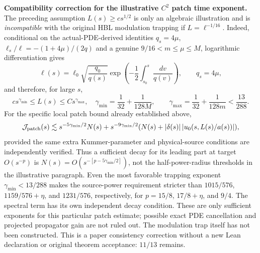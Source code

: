 \documentclass[11pt]{amsart}
\begin{document}
\medskip
\noindent\textbf{Compatibility correction for the illustrative $C^2$ patch time exponent.}
The preceding assumption $L(s)\ge cs^{1/2}$ is only an algebraic
illustration and is \emph{incompatible} with the original HBL
modulation trapping if $L=\ell^{-1/16}$. Indeed, conditional on
the actual-PDE-derived identities
$q_s=4\mu$, $\ell_s/\ell=-(1+4\mu)/(2q)$ and a genuine
$9/16<m\le\mu\le M$, logarithmic differentiation gives
\[
 \ell(s)=\ell_0\sqrt{\frac{q_0}{q(s)}}
 \exp\!\left(-\frac12\int_{s_0}^s\frac{dv}{q(v)}\right),
 \qquad q_s=4\mu,
\]
and therefore, for large $s$,
\[
 c s^{\gamma_{\min}}\le L(s)\le C s^{\gamma_{\max}},
 \quad
 \gamma_{\min}=\frac1{32}+\frac1{128M},\qquad
 \gamma_{\max}=\frac1{32}+\frac1{128m}<\frac{13}{288}.
\]
For the specific local patch bound already established above,
\[
 {\mathcal J}_{\rm patch}(s)\lesssim
 s^{-5\gamma_{\min}/2}N(s)
 +s^{-9\gamma_{\min}/2}
   (N(s)+|\delta(s)|\,|u_0(s,L(s)/a(s))|),
\]
provided the same extra Kummer-parameter and physical-source
conditions are independently verified. Thus a sufficient decay
for its leading part at target $O(s^{-p})$ is
$N(s)=O(s^{-[p-5\gamma_{\min}/2]})$, not the half-power-radius
thresholds in the illustrative paragraph. Even the most favorable
trapping exponent $\gamma_{\min}<13/288$ makes the source-power
requirement stricter than $1015/576$, $1159/576+\eta$,
and $1231/576$, respectively, for $p=15/8$, $17/8+\eta$,
and $9/4$. The spectral term has its own independent decay condition.
These are only sufficient exponents for this particular patch
estimate; possible exact PDE cancellation and projected propagator
gain are not ruled out. The modulation trap itself has not been
constructed. This is a paper consistency correction without a
new Lean declaration or original theorem acceptance:
$11/13$ remains.
\end{document}
